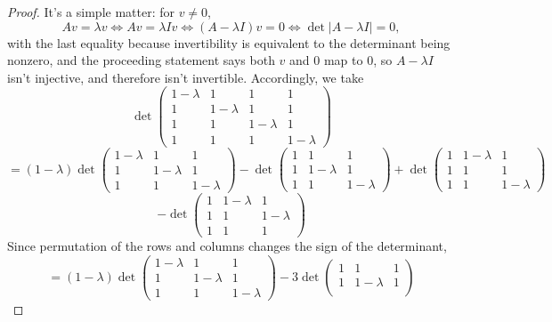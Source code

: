 \documentclass{article}
\begin{document}
\begin{proof}
  It's a simple matter: for $v \neq 0$,
  \[
    Av = \lambda v \Leftrightarrow Av = \lambda Iv \Leftrightarrow (A-\lambda I) v = 0 \Leftrightarrow \det|A - \lambda I| = 0,
  \]
  with the last equality because invertibility is equivalent to the determinant being nonzero,
  and the proceeding statement says both $v$ and $0$ map to $0$, so $A - \lambda I$ isn't injective, and therefore isn't invertible.
  Accordingly, we take
  \[
    \det
    \begin{pmatrix}
      1 - \lambda & 1 & 1 & 1 \\
      1 & 1 - \lambda & 1 & 1 \\
      1 & 1 & 1 - \lambda & 1 \\
      1 & 1 & 1 & 1 - \lambda
    \end{pmatrix}
  \]
  \[
    = (1-\lambda)\det
    \begin{pmatrix}
      1 - \lambda & 1 & 1 \\
      1 & 1 - \lambda & 1 \\
      1 & 1 & 1 - \lambda
    \end{pmatrix}
    - \det
    \begin{pmatrix}
      1 & 1 & 1 \\
      1 & 1 - \lambda & 1 \\
      1 & 1 & 1 - \lambda
    \end{pmatrix}
    + \det
    \begin{pmatrix}
      1 & 1 - \lambda & 1 \\
      1 & 1 & 1 \\
      1 & 1 & 1 - \lambda
    \end{pmatrix}
  \]
  \[
    - \det
    \begin{pmatrix}
      1 & 1 - \lambda & 1 \\
      1 & 1 & 1 - \lambda \\
      1 & 1 & 1
    \end{pmatrix}
  \]
  Since permutation of the rows and columns changes the sign of the determinant,
  \[
    = (1-\lambda)\det
    \begin{pmatrix}
      1 - \lambda & 1 & 1 \\
      1 & 1 - \lambda & 1 \\
      1 & 1 & 1 - \lambda
    \end{pmatrix}
    - 3\det
    \begin{pmatrix}
      1 & 1 & 1 \\
      1 & 1 - \lambda & 1 \\

\end{pmatrix}\]
\end{proof}
\end{document}
